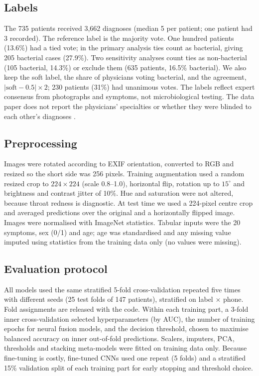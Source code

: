 \documentclass[preprint,12pt]{elsarticle}
\begin{document}
\subsection{Labels}

The 735 patients received 3,662 diagnoses (median 5 per patient; one patient had 3 recorded). The reference label is the majority vote. One hundred patients (13.6\%) had a tied vote; in the primary analysis ties count as bacterial, giving 205 bacterial cases (27.9\%). Two sensitivity analyses count ties as non-bacterial (105 bacterial, 14.3\%) or exclude them (635 patients, 16.5\% bacterial). We also keep the soft label, the share of physicians voting bacterial, and the agreement, $|\text{soft} - 0.5| \times 2$; 230 patients (31\%) had unanimous votes. The labels reflect expert consensus from photographs and symptoms, not microbiological testing. The data paper does not report the physicians' specialties or whether they were blinded to each other's diagnoses \cite{shojaei2025pgu}.

\subsection{Preprocessing}

Images were rotated according to EXIF orientation, converted to RGB and resized so the short side was 256 pixels. Training augmentation used a random resized crop to $224 \times 224$ (scale 0.8--1.0), horizontal flip, rotation up to $15^\circ$ and brightness and contrast jitter of 10\%. Hue and saturation were not altered, because throat redness is diagnostic. At test time we used a 224-pixel centre crop and averaged predictions over the original and a horizontally flipped image. Images were normalised with ImageNet statistics. Tabular inputs were the 20 symptoms, sex (0/1) and age; age was standardised and any missing value imputed using statistics from the training data only (no values were missing).

\subsection{Evaluation protocol}

All models used the same stratified 5-fold cross-validation repeated five times with different seeds (25 test folds of 147 patients), stratified on label $\times$ phone. Fold assignments are released with the code. Within each training part, a 3-fold inner cross-validation selected hyperparameters (by AUC), the number of training epochs for neural fusion models, and the decision threshold, chosen to maximise balanced accuracy on inner out-of-fold predictions. Scalers, imputers, PCA, thresholds and stacking meta-models were fitted on training data only. Because fine-tuning is costly, fine-tuned CNNs used one repeat (5 folds) and a stratified 15\% validation split of each training part for early stopping and threshold choice.
\end{document}
